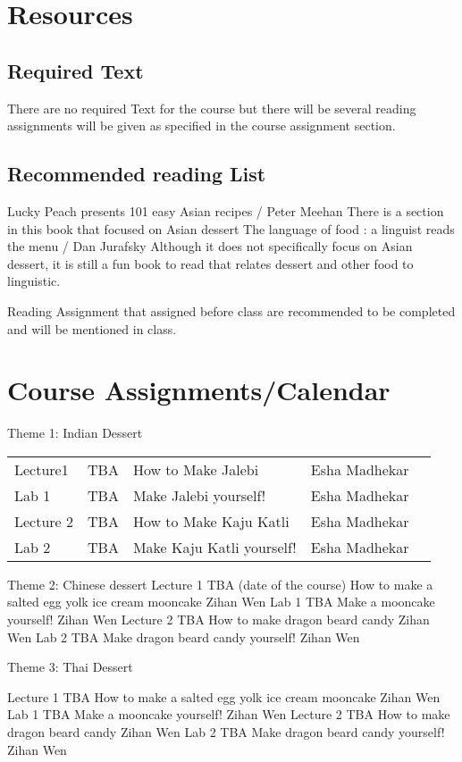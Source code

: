 \documentclass{article}
\begin{document}
\section{Resources}
\subsection{Required Text}
There are no required Text for the course but there will be several reading assignments will be given as specified in the course assignment section. 

\subsection{Recommended reading List}
Lucky Peach presents 101 easy Asian recipes / Peter Meehan 
There is a section in this book that focused on Asian dessert
The language of food : a linguist reads the menu / Dan Jurafsky
Although it does not specifically focus on Asian dessert, it is still a fun book to read that relates dessert and other food to linguistic.

Reading Assignment that assigned before class are recommended to be completed and will be mentioned in class.


\section{Course Assignments/Calendar}

Theme 1: Indian Dessert


\begin{table}[h]
\begin{tabular}{lllll}
 Lecture1 &  TBA & How to Make Jalebi & Esha Madhekar  \\
 Lab 1 &  TBA & Make Jalebi yourself! & Esha Madhekar  \\
 Lecture 2 &  TBA & How to Make Kaju Katli & Esha Madhekar  \\
 Lab 2 & TBA & Make Kaju Katli yourself! & Esha Madhekar 
\end{tabular}
\end{table}

Theme 2: Chinese dessert
Lecture 1
TBA
(date of the course)
How to make a salted egg yolk ice cream mooncake 
Zihan Wen
Lab 1 
TBA
Make a mooncake yourself!
Zihan Wen
Lecture 2
TBA
How to make dragon beard candy
Zihan Wen
Lab 2 
TBA
Make dragon beard candy yourself!
Zihan Wen

Theme 3: Thai Dessert

Lecture 1
TBA
How to make a salted egg yolk ice cream mooncake 
Zihan Wen
Lab 1 
TBA
Make a mooncake yourself!
Zihan Wen
Lecture 2 
TBA
How to make dragon beard candy
Zihan Wen
Lab 2 
TBA
Make dragon beard candy yourself!
Zihan Wen
\end{document}
